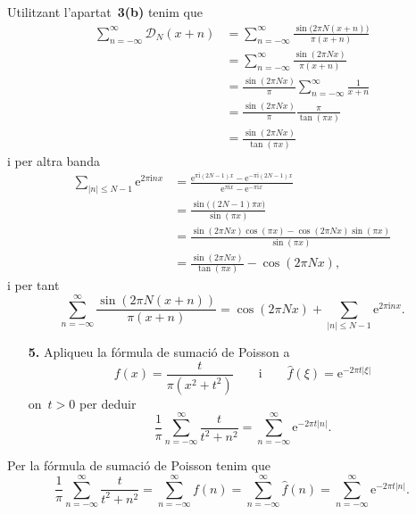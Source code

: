 \documentclass[a4paper]{article}
\theoremstyle{plain}
\newcommand{\iu}{\mathrm{i}}
\newcommand{\e}{\mathrm{e}}
\providecommand{\uppi}{\pi}
\newcommand{\abs}[1]{\lvert{#1}\rvert}
\newcommand{\D}{\mathcal{D}}
\begin{document}
Utilitzant l'apartat~\textbf{3(b)} tenim que
\begin{align*}
    \sum_{n=-\infty}^{\infty} \D_{N}(x+n)
        &= \sum_{n=-\infty}^{\infty}
           \frac{\sin\bigl(2\uppi N(x+n)\bigr)}{\uppi(x+n)} \\
        &= \sum_{n=-\infty}^{\infty}
           \frac{\sin(2\uppi Nx)}{\uppi(x+n)} \\
        &= \frac{\sin(2\uppi Nx)}{\uppi}
           \sum_{n=-\infty}^{\infty}
           \frac{1}{x+n} \\
        &= \frac{\sin(2\uppi Nx)}{\uppi}
           \frac{\uppi}{\tan(\uppi x)} \\
        &= \frac{\sin(2\uppi Nx)}{\tan(\uppi x)}
\end{align*}
i per altra banda
\begin{align*}
    \sum_{\abs{n} \leq N-1} \e^{2\uppi\iu nx}
        &= \frac{\e^{\uppi\iu(2N-1)x}-\e^{-\uppi\iu(2N-1)x}}
           {\e^{\uppi\iu x}-\e^{-\uppi\iu x}} \\
        &= \frac{\sin\bigl((2N-1)\uppi x\bigr)}{\sin(\uppi x)} \\
        &= \frac{\sin(2\uppi Nx)\cos(\uppi x) - \cos(2\uppi Nx)\sin(\uppi x)}
           {\sin(\uppi x)} \\
        &= \frac{\sin(2\uppi Nx)}{\tan(\uppi x)} - \cos(2\uppi Nx),
\end{align*}
i per tant
\[
    \sum_{n=-\infty}^{\infty}
    \frac{\sin(2\uppi N(x+n))}{\uppi(x+n)}
    =
    \cos(2\uppi Nx) +
    \sum_{\abs{n} \leq N-1} \e^{2\uppi\iu nx}.
\]

\begin{enumerate}
    \item[\textbf{5.}] Apliqueu la fórmula de sumació de Poisson a
        \[
            f(x) = \frac{t}{\uppi(x^{2}+t^{2})}
            \qquad
            \text{i}
            \qquad
            \widehat{f}(\xi) = \e^{-2\uppi t\abs{\xi}}
        \]
        on~\(t>0\) per deduir
        \[
            \frac{1}{\uppi}
            \sum_{n=-\infty}^{\infty}
            \frac{t}{t^{2}+n^{2}}
            =
            \sum_{n=-\infty}^{\infty}
            \e^{-2\uppi t\abs{n}}.
        \]
\end{enumerate}

Per la fórmula de sumació de Poisson tenim que
\[
    \frac{1}{\uppi}
    \sum_{n=-\infty}^{\infty}
    \frac{t}{t^{2}+n^{2}}
    =
    \sum_{n=-\infty}^{\infty} f(n)
    =
    \sum_{n=-\infty}^{\infty} \widehat{f}(n)
    =
    \sum_{n=-\infty}^{\infty}
    \e^{-2\uppi t\abs{n}}.
\]
\end{document}
